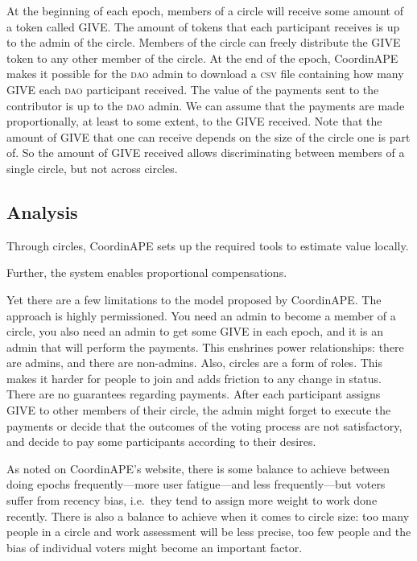 At the beginning of each epoch, members of a circle will receive some amount of a token called GIVE.
The amount of tokens that each participant receives is up to the admin of the circle.
Members of the circle can freely distribute the GIVE token to any other member of the circle.
At the end of the epoch, CoordinAPE makes it possible for the \textsc{dao} admin to download a \textsc{csv} file containing how many GIVE each \textsc{dao} participant received.
The value of the payments sent to the contributor is up to the \textsc{dao} admin.
We can assume that the payments are made proportionally, at least to some extent, to the GIVE received.
Note that the amount of GIVE that one can receive depends on the size of the circle one is part of.
So the amount of GIVE received allows discriminating between members of a single circle, but not across circles.

\subsection{Analysis}

%
Through circles, CoordinAPE sets up the required tools to estimate value locally.

%
Further, the system enables proportional compensations.

%
Yet there are a few limitations to the model proposed by CoordinAPE.
The approach is highly permissioned.
You need an admin to become a member of a circle, you also need an admin to get some GIVE in each epoch, and it is an admin that will perform the payments.
This enshrines power relationships: there are admins, and there are non-admins.
Also, circles are a form of roles.
This makes it harder for people to join and adds friction to any change in status.
There are no guarantees regarding payments.
After each participant assigns GIVE to other members of their circle, the admin might forget to execute the payments or decide that the outcomes of the voting process are not satisfactory, and decide to pay some participants according to their desires.

As noted on CoordinAPE's website, there is some balance to achieve between doing epochs frequently---more user fatigue---and less frequently---but voters suffer from recency bias, i.e.\ they tend to assign more weight to work done recently.
There is also a balance to achieve when it comes to circle size: too many people in a circle and work assessment will be less precise, too few people and the bias of individual voters might become an important factor.


